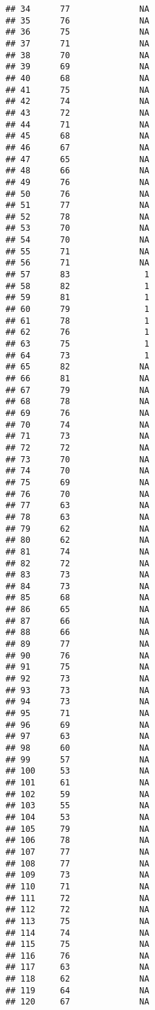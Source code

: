 \documentclass[]{article}
\begin{document}
\begin{verbatim}
## 34      77              NA
## 35      76              NA
## 36      75              NA
## 37      71              NA
## 38      70              NA
## 39      69              NA
## 40      68              NA
## 41      75              NA
## 42      74              NA
## 43      72              NA
## 44      71              NA
## 45      68              NA
## 46      67              NA
## 47      65              NA
## 48      66              NA
## 49      76              NA
## 50      76              NA
## 51      77              NA
## 52      78              NA
## 53      70              NA
## 54      70              NA
## 55      71              NA
## 56      71              NA
## 57      83               1
## 58      82               1
## 59      81               1
## 60      79               1
## 61      78               1
## 62      76               1
## 63      75               1
## 64      73               1
## 65      82              NA
## 66      81              NA
## 67      79              NA
## 68      78              NA
## 69      76              NA
## 70      74              NA
## 71      73              NA
## 72      72              NA
## 73      70              NA
## 74      70              NA
## 75      69              NA
## 76      70              NA
## 77      63              NA
## 78      63              NA
## 79      62              NA
## 80      62              NA
## 81      74              NA
## 82      72              NA
## 83      73              NA
## 84      73              NA
## 85      68              NA
## 86      65              NA
## 87      66              NA
## 88      66              NA
## 89      77              NA
## 90      76              NA
## 91      75              NA
## 92      73              NA
## 93      73              NA
## 94      73              NA
## 95      71              NA
## 96      69              NA
## 97      63              NA
## 98      60              NA
## 99      57              NA
## 100     53              NA
## 101     61              NA
## 102     59              NA
## 103     55              NA
## 104     53              NA
## 105     79              NA
## 106     78              NA
## 107     77              NA
## 108     77              NA
## 109     73              NA
## 110     71              NA
## 111     72              NA
## 112     72              NA
## 113     75              NA
## 114     74              NA
## 115     75              NA
## 116     76              NA
## 117     63              NA
## 118     62              NA
## 119     64              NA
## 120     67              NA

\end{verbatim}
\end{document}
